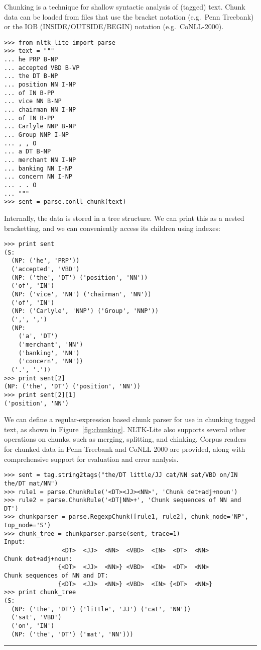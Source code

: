 \documentclass[11pt]{article}
\begin{document}
Chunking is a technique for shallow syntactic analysis of (tagged)
text.  Chunk data can be loaded from files that use the bracket notation
(e.g.\ Penn Treebank) or the IOB (INSIDE/OUTSIDE/BEGIN) notation
(e.g.\ CoNLL-2000).

{\small\begin{verbatim}
>>> from nltk_lite import parse
>>> text = """
... he PRP B-NP
... accepted VBD B-VP
... the DT B-NP
... position NN I-NP
... of IN B-PP
... vice NN B-NP
... chairman NN I-NP
... of IN B-PP
... Carlyle NNP B-NP
... Group NNP I-NP
... , , O
... a DT B-NP
... merchant NN I-NP
... banking NN I-NP
... concern NN I-NP
... . . O
... """
>>> sent = parse.conll_chunk(text)
\end{verbatim}}
    
\noindent
Internally, the data is stored in a tree structure.  We can
print this as a nested bracketting, and we can conveniently access
its children using indexes:

{\small\begin{verbatim}
>>> print sent
(S:
  (NP: ('he', 'PRP'))
  ('accepted', 'VBD')
  (NP: ('the', 'DT') ('position', 'NN'))
  ('of', 'IN')
  (NP: ('vice', 'NN') ('chairman', 'NN'))
  ('of', 'IN')
  (NP: ('Carlyle', 'NNP') ('Group', 'NNP'))
  (',', ',')
  (NP:
    ('a', 'DT')
    ('merchant', 'NN')
    ('banking', 'NN')
    ('concern', 'NN'))
  ('.', '.'))
>>> print sent[2]
(NP: ('the', 'DT') ('position', 'NN'))
>>> print sent[2][1]
('position', 'NN')
\end{verbatim}}

We can define a regular-expression based chunk parser for use in chunking tagged
text, as shown in Figure~\ref{fig:chunking}.  NLTK-Lite also supports several other
operations on chunks, such as merging, splitting, and chinking.  Corpus readers
for chunked data in Penn Treebank and CoNLL-2000 are provided, along with comprehensive
support for evaluation and error analysis.

\begin{figure*}[t]
{\small\begin{verbatim}
>>> sent = tag.string2tags("the/DT little/JJ cat/NN sat/VBD on/IN the/DT mat/NN")
>>> rule1 = parse.ChunkRule('<DT><JJ><NN>', 'Chunk det+adj+noun')
>>> rule2 = parse.ChunkRule('<DT|NN>+', 'Chunk sequences of NN and DT')
>>> chunkparser = parse.RegexpChunk([rule1, rule2], chunk_node='NP', top_node='S')
>>> chunk_tree = chunkparser.parse(sent, trace=1)
Input:
                <DT>  <JJ>  <NN>  <VBD>  <IN>  <DT>  <NN> 
Chunk det+adj+noun:
               {<DT>  <JJ>  <NN>} <VBD>  <IN>  <DT>  <NN> 
Chunk sequences of NN and DT:
               {<DT>  <JJ>  <NN>} <VBD>  <IN> {<DT>  <NN>}
>>> print chunk_tree
(S:
  (NP: ('the', 'DT') ('little', 'JJ') ('cat', 'NN'))
  ('sat', 'VBD')
  ('on', 'IN')
  (NP: ('the', 'DT') ('mat', 'NN')))
\end{verbatim}}
\caption{Regular-Expression based Chunk Parser\label{fig:chunking}}
\vspace{1ex}\hrule
\end{figure*}
\end{document}
